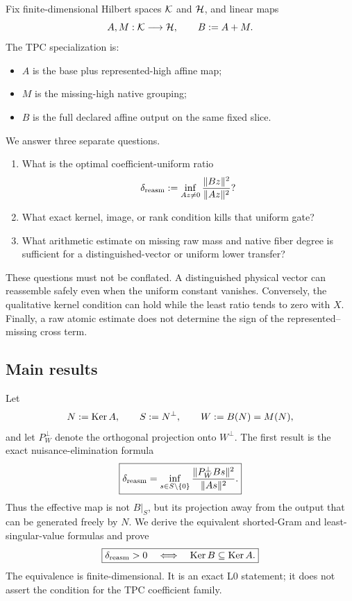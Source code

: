 Fix finite-dimensional Hilbert spaces \(\mathcal K\) and \(\mathcal H\), and linear maps
\begin{equation}
 A,M:\mathcal K\longrightarrow\mathcal H,
 \qquad B:=A+M.
 \label{eq:tpc60-abstract-maps-intro}
\end{equation}
The TPC specialization is:
\begin{itemize}[leftmargin=2em]
 \item \(A\) is the base plus represented-high affine map;
 \item \(M\) is the missing-high native grouping;
 \item \(B\) is the full declared affine output on the same fixed slice.
\end{itemize}
We answer three separate questions.

\begin{enumerate}[leftmargin=2.2em]
 \item What is the optimal coefficient-uniform ratio
 \begin{equation}
  \delta_{\rm reasm}
  :=\inf_{Az\ne0}\frac{\|Bz\|^2}{\|Az\|^2}?
  \label{eq:tpc60-delta-intro}
 \end{equation}
 \item What exact kernel, image, or rank condition kills that uniform gate?
 \item What arithmetic estimate on missing raw mass and native fiber degree
       is sufficient for a distinguished-vector or uniform lower transfer?
\end{enumerate}

These questions must not be conflated.  A distinguished physical vector
can reassemble safely even when the uniform constant vanishes.  Conversely,
the qualitative kernel condition can hold while the least ratio tends to
zero with \(X\).  Finally, a raw atomic estimate does not determine the
sign of the represented--missing cross term.

\subsection{Main results}

Let
\begin{equation}
 N:=\operatorname{Ker} A,
 \qquad S:=N^\perp,
 \qquad W:=B(N)=M(N),
 \label{eq:tpc60-NSW-intro}
\end{equation}
and let \(P_W^\perp\) denote the orthogonal projection onto \(W^\perp\).
The first result is the exact nuisance-elimination formula
\begin{equation}
 \boxed{
 \delta_{\rm reasm}
 =\inf_{s\in S\setminus\{0\}}
   \frac{\|P_W^\perp Bs\|^2}{\|As\|^2}.}
 \label{eq:tpc60-main-short-formula-intro}
\end{equation}
Thus the effective map is not \(B|_S\), but its projection away from the
output that can be generated freely by \(N\).  We derive the equivalent
shorted-Gram and least-singular-value formulas and prove
\begin{equation}
 \boxed{
 \delta_{\rm reasm}>0
 \quad\Longleftrightarrow\quad
 \operatorname{Ker} B\subseteq\operatorname{Ker} A.}
 \label{eq:tpc60-main-kernel-intro}
\end{equation}
The equivalence is finite-dimensional.  It is an exact L0 statement; it
does not assert the condition for the TPC coefficient family.

